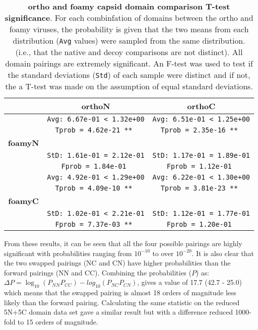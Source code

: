 \begin{table}
\centering
\begin{tabular}{c|c|c|}
             &          {\bf orthoN}           &          {\bf orthoC}           \\
\hline \hline
             & {\tt Avg: 6.67e-01 < 1.32e+00 } & {\tt Avg: 6.51e-01 < 1.25e+00 } \\
             & {\tt Tprob = 4.62e-21 **      } & {\tt Tprob = 2.35e-16 **      } \\
{\bf foamyN} &                                 &                                 \\
             & {\tt StD: 1.61e-01 = 2.12e-01 } & {\tt StD: 1.17e-01 = 1.89e-01 } \\
             & {\tt Fprob = 1.84e-01         } & {\tt Fprob = 1.12e-01         } \\
\hline
             & {\tt Avg: 4.92e-01 < 1.29e+00 } & {\tt Avg: 6.22e-01 < 1.30e+00 } \\
             & {\tt Tprob = 4.09e-10 **      } & {\tt Tprob = 3.81e-23 **      } \\
{\bf foamyC} &                                 &                                 \\
             & {\tt StD: 1.02e-01 < 2.21e-01 } & {\tt StD: 1.12e-01 = 1.77e-01 } \\
             & {\tt Fprob = 7.37e-03 **      } & {\tt Fprob = 1.20e-01         } \\
\hline \hline
\end{tabular}
\begin{footnotesize}
\caption{
\label{Tab:Ttest}
{\bf ortho and foamy capsid domain comparison T-test significance}.
For each combinfation of domains between the ortho and foamy viruses, the probability
is given that the two means from each distribution ({\tt Avg} values) were sampled
from the same distribution.  (i.e., that the native and decoy comparisons are
not distinct).   All domain pairings are extremely significant.   An F-test was used to
test if the standard deviations ({\tt Std}) of each sample were distinct and if not,
the a T-test was made on the assumption of equal standard deviations.
}
\end{footnotesize}
\end{table}

From these results, it can be seen that all the four possible pairings are
highly significant with probabilities ranging from $10^{-10}$ to over $10^{-20}$.
It is also clear that the two swapped pairings (NC and CN) have higher probabilities
than the forward pairings (NN and CC).   Combining the probabilities ($P$) as:
$\Delta P = \log_{10}(P_{NN} P_{CC}) - log_{10}(P_{NC} P_{CN})$,
gives a value of 17.7 (42.7 - 25.0) which means that the swapped pairing is almost 18
orders of magnitude less likely than the forward pairing.
Calculating the same statistic on the reduced 5N+5C domain data set gave a similar result
but with a difference reduced 1000-fold to 15 orders of magnitude.

